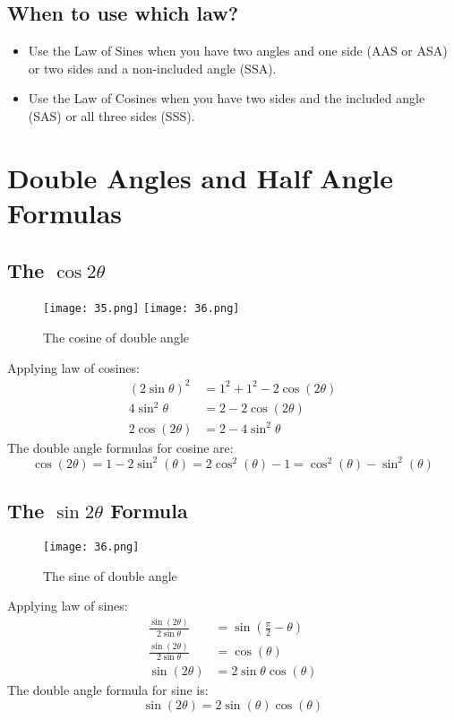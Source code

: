 \subsection{When to use which law?}
\begin{itemize}
    \item Use the Law of Sines when you have two angles and one side (AAS or ASA) or two sides and a non-included angle (SSA).
    \item Use the Law of Cosines when you have two sides and the included angle (SAS) or all three sides (SSS).
\end{itemize}

\section{Double Angles and Half Angle Formulas}
\subsection{The $\cos 2\theta$}
\begin{figure}
    \centering
    \texttt{[image: 35.png]}
    \texttt{[image: 36.png]}
    \caption{The cosine of double angle}
\end{figure}
Applying law of cosines:
\begin{align}
    (2\sin \theta)^2 &= 1^2 + 1^2 - 2\cos(2\theta) \\
    4\sin^2 \theta &= 2 - 2\cos(2\theta) \\
    2\cos(2\theta) &= 2 - 4\sin^2 \theta
\end{align}
The double angle formulas for cosine are:
\[ \cos(2\theta)  = 1 - 2\sin^2(\theta) = 2\cos^2(\theta) - 1= \cos^2(\theta) - \sin^2(\theta) \]

\subsection{The $\sin 2\theta$ Formula}
\begin{figure}
    \centering
    \texttt{[image: 36.png]}
    \caption{The sine of double angle}
\end{figure}
Applying law of sines:
\begin{align}
    \frac{\sin(2\theta)}{2\sin \theta} &= \sin(\frac{\pi}{2} - \theta) \\
    \frac{\sin(2\theta)}{2\sin \theta} &= \cos(\theta) \\
    \sin(2\theta) &= 2\sin \theta \cos(\theta)
\end{align}
The double angle formula for sine is:
\[ \sin(2\theta) = 2\sin(\theta)\cos(\theta) \]

